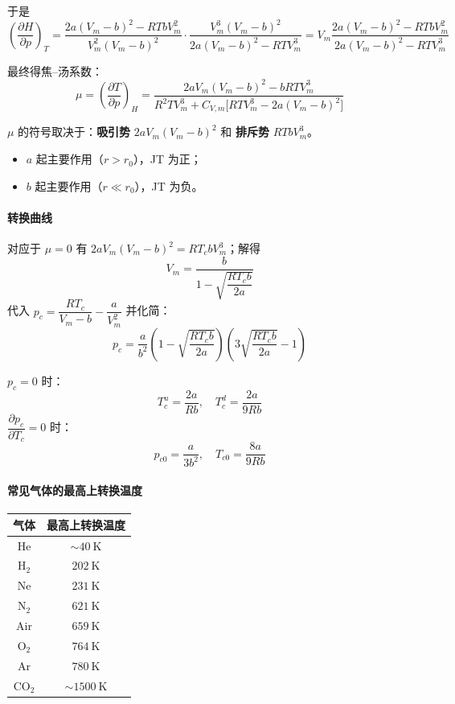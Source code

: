 \documentclass[UTF8]{ctexart}
\theoremstyle{definition}
\begin{document}
于是
\begin{equation}
\left(\frac{\partial H}{\partial p}\right)_T = \frac{2a(V_m-b)^2-RTbV_m^2}{V_m^2(V_m-b)^2}\cdot\frac{V_m^3(V_m-b)^2}{2a(V_m-b)^2-RTV_m^3} = V_m\frac{2a(V_m-b)^2-RTbV_m^2}{2a(V_m-b)^2-RTV_m^3}
\end{equation}

最终得焦--汤系数：
\begin{equation}
\mu = \left(\frac{\partial T}{\partial p}\right)_H = \frac{2aV_m(V_m-b)^2-bRTV_m^3}{R^2TV_m^3+C_{V,m}\bigl[RTV_m^3-2a(V_m-b)^2\bigr]}
\end{equation}

$\mu$ 的符号取决于：\textbf{吸引势} $2aV_m(V_m-b)^2$ 和 \textbf{排斥势} $RTbV_m^3$。
\begin{itemize}
    \item $a$ 起主要作用（$r>r_0$），JT 为正；
    \item $b$ 起主要作用（$r\ll r_0$），JT 为负。
\end{itemize}

\paragraph{转换曲线}

对应于 $\mu=0$ 有 $2aV_m(V_m-b)^2 = RT_cbV_m^3$；解得
\begin{equation}
V_m = \frac{b}{1-\sqrt{\dfrac{RT_cb}{2a}}}
\end{equation}
代入 $p_c = \dfrac{RT_c}{V_m-b} - \dfrac{a}{V_m^2}$ 并化简：
\begin{equation}
p_c = \frac{a}{b^2}\left(1-\sqrt{\frac{RT_cb}{2a}}\right)\left(3\sqrt{\frac{RT_cb}{2a}}-1\right)
\end{equation}

$p_c=0$ 时：
\begin{equation}
T_c^u = \frac{2a}{Rb},\quad T_c^d = \frac{2a}{9Rb}
\end{equation}
$\dfrac{\partial p_c}{\partial T_c}=0$ 时：
\begin{equation}
p_{c0} = \frac{a}{3b^2},\quad T_{c0} = \frac{8a}{9Rb}
\end{equation}

\paragraph{常见气体的最高上转换温度}
\begin{center}
\begin{tabular}{c|c}
\hline
气体 & 最高上转换温度 \\
\hline
He & $\sim 40\ \mathrm{K}$ \\
H$_2$ & $202\ \mathrm{K}$ \\
Ne & $231\ \mathrm{K}$ \\
N$_2$ & $621\ \mathrm{K}$ \\
Air & $659\ \mathrm{K}$ \\
O$_2$ & $764\ \mathrm{K}$ \\
Ar & $780\ \mathrm{K}$ \\
CO$_2$ & $\sim 1500\ \mathrm{K}$ \\
\hline
\end{tabular}
\end{center}
\end{document}
